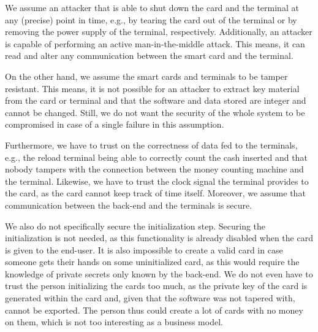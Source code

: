 We assume an attacker that is able to shut down the card and the terminal at any (precise) point in time, e.g., by tearing the card out of the terminal or by removing the power supply of the terminal, respectively.
Additionally, an attacker is capable of performing an active man-in-the-middle attack.
This means, it can read and alter any communication between the smart card and the terminal.

On the other hand, we assume the smart cards and terminals to be tamper resistant.
This means, it is not possible for an attacker to extract key material from the card or terminal and that the software and data stored are integer and cannot be changed.
Still, we do not want the security of the whole system to be compromised in case of a single failure in this assumption.

Furthermore, we have to trust on the correctness of data fed to the terminals, e.g., the reload terminal being able to correctly count the cash inserted and that nobody tampers with the connection between the money counting machine and the terminal.
Likewise, we have to trust the clock signal the terminal provides to the card, as the card cannot keep track of time itself.
Moreover, we assume that communication between the back-end and the terminals is secure.

We also do not specifically secure the initialization step.
Securing the initialization is not needed, as this functionality is already disabled when the card is given to the end-user.
It is also impossible to create a valid card in case someone gets their hands on some uninitialized card, as this would require the knowledge of private secrets only known by the back-end.
We do not even have to trust the person initializing the cards too much, as the private key of the card is generated within the card and, given that the software was not tapered with, cannot be exported.
The person thus could create a lot of cards with no money on them, which is not too interesting as a business model.



